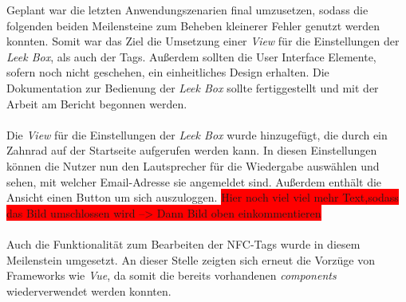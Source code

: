 \documentclass[10pt, a4paper]{article}
\begin{document}
\begin{onehalfspace}
Geplant war die letzten Anwendungszenarien final umzusetzen, sodass die folgenden beiden Meilensteine zum Beheben kleinerer Fehler genutzt werden konnten.
Somit war das Ziel die Umsetzung einer \textit{View} für die Einstellungen der \textit{Leek Box}, als auch der Tags.
Außerdem sollten die User Interface Elemente, sofern noch nicht geschehen, ein einheitliches Design erhalten.
Die Dokumentation zur Bedienung der \textit{Leek Box} sollte fertiggestellt und mit der Arbeit am Bericht begonnen werden.
\\~\\
Die \textit{View} für die Einstellungen der \textit{Leek Box} wurde hinzugefügt, die durch ein Zahnrad auf der Startseite aufgerufen werden kann.
In diesen Einstellungen können die Nutzer nun den Lautsprecher für die Wiedergabe auswählen und sehen, mit welcher Email-Adresse sie angemeldet sind. Außerdem enthält die Ansicht einen Button um sich auszuloggen.
\colorbox{red}{Hier noch viel viel mehr Text,sodass das Bild umschlossen wird --> Dann Bild oben einkommentieren }
\\~\\
Auch die Funktionalität zum Bearbeiten der NFC-Tags wurde in diesem Meilenstein umgesetzt.
An dieser Stelle zeigten sich erneut die Vorzüge von Frameworks wie \textit{Vue}, da somit die bereits vorhandenen \textit{components} wiederverwendet werden konnten.

\end{onehalfspace}
\end{document}
